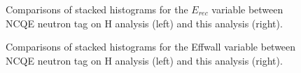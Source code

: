\begin{figure}[!htbp]
    \centering
    
   
    
      \hfill 
      \par
    \caption{Comparisons of stacked histograms for the $E_{rec}$ variable between NCQE neutron tag on H analysis (left) and this analysis (right).} \label{fig:erec_reduction} 
        
\end{figure}

\begin{figure}[!htbp]
    \centering
    
   
    
      \hfill 
     \par
    \caption{Comparisons of stacked histograms for the Effwall variable between NCQE neutron tag on H analysis (left) and this analysis (right).} \label{fig:effwall_reduction} 
        
\end{figure}


